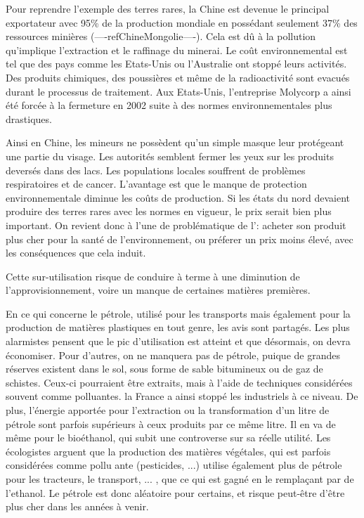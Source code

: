 Pour reprendre l'exemple des terres rares, la Chine est devenue le principal exportateur avec 95\% de la production mondiale en possédant seulement 37\% des ressources minières (----refChineMongolie----). Cela est dû à la pollution qu'implique l'extraction et le raffinage du minerai. Le coût environnemental est tel que des pays comme les Etats-Unis ou l'Australie ont stoppé leurs activités. Des produits chimiques, des poussières et même de la radioactivité sont evacués durant le processus de traitement. Aux Etats-Unis, l'entreprise Molycorp a ainsi été forcée à la fermeture en 2002 suite à des normes environnementales plus drastiques.

Ainsi en Chine, les mineurs ne possèdent qu'un simple masque leur protégeant une partie du visage. Les autorités semblent fermer les yeux sur les produits deversés dans des lacs. Les populations locales souffrent de problèmes respiratoires et de cancer. L'avantage est que le manque de protection environnementale diminue les coûts de production. Si les états du nord devaient produire des terres rares avec les normes en vigueur, le prix serait bien plus important. On revient donc à l'une de problématique de l'\op : acheter son produit plus cher pour la santé de l'environnement, ou préferer un prix moins élevé, avec les conséquences que cela induit.


\smallbreak Cette sur-utilisation risque de conduire à terme à une diminution de l'approvisionnement, voire un manque de certaines matières premières.

En ce qui concerne le pétrole, utilisé pour les transports mais également pour la production de matières plastiques en tout genre, les avis sont partagés. Les plus alarmistes pensent que le pic d'utilisation est atteint et que désormais, on devra économiser. Pour d'autres, on ne manquera pas de pétrole, puique de grandes réserves existent dans le sol, sous forme de sable bitumineux ou de gaz de schistes. Ceux-ci pourraient être extraits, mais à l'aide de techniques considérées souvent comme polluantes. la France a ainsi stoppé les industriels à ce niveau. De plus, l'énergie apportée pour l'extraction ou la transformation d'un litre de pétrole sont parfois supérieurs à ceux produits par ce même litre. Il en va de même pour le bioéthanol, qui subit une controverse sur sa réelle utilité. Les écologistes arguent que la production des matières végétales, qui est parfois considérées comme pollu	ante (pesticides, ...) utilise également plus de pétrole pour les tracteurs, le transport, ... , que ce qui est gagné en le remplaçant par de l'ethanol. Le pétrole est donc aléatoire pour certains, et risque peut-être d'être plus cher dans les années à venir.


